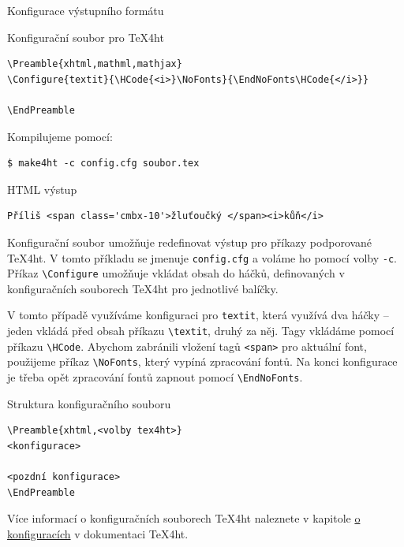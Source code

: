 \begin{frame}[fragile]{Konfigurace výstupního formátu}
\begin{block}{Konfigurační soubor pro \TeX4ht}
\begin{verbatim}
\Preamble{xhtml,mathml,mathjax}
\Configure{textit}{\HCode{<i>}\NoFonts}{\EndNoFonts\HCode{</i>}}

\EndPreamble
\end{verbatim}
\end{block}

\begin{block}{Kompilujeme pomocí:}
\begin{verbatim}
$ make4ht -c config.cfg soubor.tex
\end{verbatim}
\end{block}

\begin{block}{HTML výstup}
\begin{verbatim}
Příliš <span class='cmbx-10'>žluťoučký </span><i>kůň</i>  
\end{verbatim}
\end{block}
\end{frame}

Konfigurační soubor  umožňuje redefinovat výstup
pro příkazy podporované \TeX4ht. V tomto příkladu
se jmenuje \texttt{config.cfg} a voláme ho pomocí volby \texttt{-c}.
Příkaz \verb|\Configure| umožňuje vkládat obsah do háčků, definovaných v 
konfiguračních souborech \TeX4ht pro jednotlivé balíčky. 

V tomto případě využíváme konfiguraci pro \texttt{textit}, která využívá
dva háčky -- jeden vkládá před obsah příkazu \verb|\textit|, druhý za něj.
Tagy vkládáme pomocí příkazu \verb|\HCode|. Abychom zabránili vložení tagů
\verb|<span>| pro aktuální font, použijeme příkaz \verb|\NoFonts|, který 
vypíná zpracování fontů. Na konci konfigurace je třeba opět zpracování fontů
zapnout pomocí \verb|\EndNoFonts|.

\begin{frame}[fragile]{Struktura konfiguračního souboru}
\begin{verbatim}
\Preamble{xhtml,<volby tex4ht>}
<konfigurace>

<pozdní konfigurace>
\EndPreamble
\end{verbatim}
\end{frame}

Více informací o konfiguračních souborech \TeX4ht naleznete v kapitole
\href{https://www.kodymirus.cz/tex4ht-doc/Configurations.html}{o konfiguracích}
v dokumentaci \TeX4ht.


